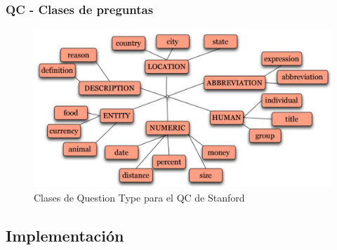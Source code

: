 \begin{frame}
  \frametitle{QC - Clases de preguntas}
  \begin{figure}
      \includegraphics[scale=0.4]{graficos/li-roth-qc-classes}
    \caption{Clases de Question Type para el QC de Stanford}
    \label{fig:tareas}
  \end{figure}
\end{frame}




\subsection{Implementación}



